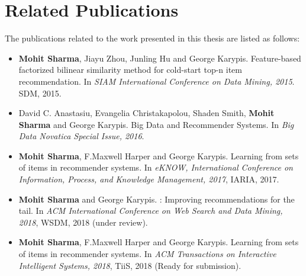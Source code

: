 
\section{Related Publications}
The publications related to the work presented in this thesis are listed as follows:
\label{ch:intro:pub}
\begin{itemize}
    
    \item{\textbf{Mohit Sharma}, Jiayu Zhou, Junling Hu and George Karypis. Feature-based factorized bilinear similarity method for cold-start top-n item recommendation. In \emph{SIAM International Conference on Data Mining, 2015}. SDM, 2015.}
    
    \item{David C. Anastasiu, Evangelia Christakapolou, Shaden Smith, \textbf{Mohit Sharma} and George Karypis. Big Data and Recommender Systems. In \emph{Big Data Novatica Special Issue, 2016}.}
    
    \item{\textbf{Mohit Sharma}, F.Maxwell Harper and George Karypis. Learning from sets of items in recommender systems. In \emph{eKNOW, International Conference on Information, Process, and Knowledge Management, 2017}, IARIA, 2017.}
    
    \item{\textbf{Mohit Sharma} and George Karypis. \TMF: Improving recommendations for the tail. In \emph{ACM International Conference on Web Search and Data Mining, 2018}, WSDM, 2018 (under review).}
    
    
    \item{\textbf{Mohit Sharma}, F.Maxwell Harper and George Karypis. Learning from sets of items in recommender systems. In \emph{ACM Transactions on Interactive Intelligent Systems, 2018}, TiiS, 2018 (Ready for submission).}
    
\end{itemize}




